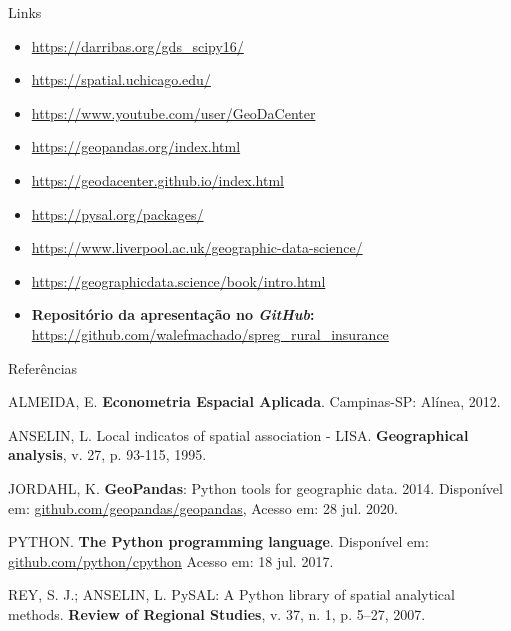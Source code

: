 \documentclass[aspectratio=169]{beamer}
\begin{document}
\begin{frame}{Links}
\begin{itemize}
    \item \url{https://darribas.org/gds_scipy16/}
    \item \url{https://spatial.uchicago.edu/}
    \item \url{https://www.youtube.com/user/GeoDaCenter}
    \item \url{https://geopandas.org/index.html}
    \item \url{https://geodacenter.github.io/index.html}
    \item \url{https://pysal.org/packages/}
    \item \url{https://www.liverpool.ac.uk/geographic-data-science/}
    \item \url{https://geographicdata.science/book/intro.html}
    \item \textbf{Repositório da apresentação no \textit{GitHub}:} \url{https://github.com/walefmachado/spreg_rural_insurance}
\end{itemize}
\end{frame}

\begin{frame}{Referências}
	\begin{flushleft}
			\footnotesize{

				{ALMEIDA, E. \textbf{Econometria Espacial Aplicada}. Campinas-SP: Alínea, 2012.}
				
				\vspace{0.25cm}
					
				{ANSELIN, L. Local indicatos of spatial association - LISA. \textbf{Geographical analysis}, v. 27, p. 93-115, 1995.}	

				\vspace{0.25cm}
				
				{JORDAHL, K. \textbf{GeoPandas}: Python tools for geographic data. 2014. Disponível em: \url{github.com/geopandas/geopandas}, Acesso em: 28 jul. 2020.}
				
				\vspace{0.25cm}
				
				{PYTHON. \textbf{The Python programming language}. Disponível em: \url{github.com/python/cpython}  Acesso em: 18 jul. 2017.}

				\vspace{0.25cm}

		    	{REY, S. J.; ANSELIN, L. PySAL: A Python library of spatial analytical methods.\textbf{ Review of Regional Studies}, v. 37, n. 1, p. 5–27, 2007.}
		    }
	\end{flushleft}
\end{frame}
\end{document}

